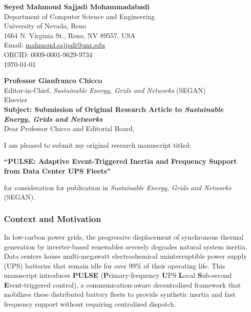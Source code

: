 \documentclass[11pt,a4paper]{article}
\begin{document}
\textbf{Seyed Mahmoud Sajjadi Mohammadabadi}\\
Department of Computer Science and Engineering\\
University of Nevada, Reno\\
1664 N. Virginia St., Reno, NV 89557, USA\\
Email: \href{mailto:mahmoud.sajjadi@unr.edu}{mahmoud.sajjadi@unr.edu}\\
ORCID: 0009-0001-9629-9734\\[1em]
\today

\textbf{Professor Gianfranco Chicco}\\
Editor-in-Chief, \textit{Sustainable Energy, Grids and Networks} (SEGAN)\\
Elsevier\\[1em]

\textbf{Subject: Submission of Original Research Article to \textit{Sustainable Energy, Grids and Networks}}\\[0.8em]

Dear Professor Chicco and Editorial Board,

I am pleased to submit my original research manuscript titled:

\begin{center}
\large\textbf{``PULSE: Adaptive Event-Triggered Inertia and Frequency Support from Data Center UPS Fleets''}
\end{center}

for consideration for publication in \textit{Sustainable Energy, Grids and Networks} (SEGAN).

\subsubsection*{Context and Motivation}
In low-carbon power grids, the progressive displacement of synchronous thermal generation by inverter-based renewables severely degrades natural system inertia. Data centers house multi-megawatt electrochemical uninterruptible power supply (UPS) batteries that remain idle for over $99\%$ of their operating life. This manuscript introduces \textbf{PULSE} (\textbf{P}rimary-frequency \textbf{U}PS \textbf{L}ocal \textbf{S}ub-second \textbf{E}vent-triggered control), a communication-aware decentralized framework that mobilizes these distributed battery fleets to provide synthetic inertia and fast frequency support without requiring centralized dispatch.
\end{document}
